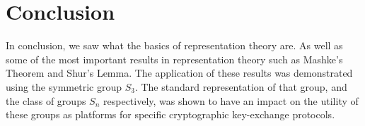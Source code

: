 \section{Conclusion}

In conclusion, we saw what the basics of representation theory are.
As well as some of the most important results in representation theory such as Mashke's Theorem and Shur's Lemma.
The application of these results was demonstrated using the symmetric group $S_3$.
The standard representation of that group, and the class of groups $S_n$ respectively, was shown to have an impact on the utility of these groups as platforms for specific cryptographic key-exchange protocols.
